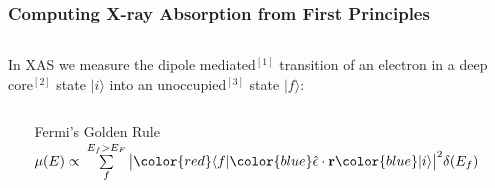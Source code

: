 \newcommand{\GMS}{\mathbb{G}}
\newcommand{\Gnot}{\mathsf{G^0}}
\newcommand{\tmat}{\mathsf{t}}
\newcommand{\boldr}{\boldsymbol{r}}

\begin{frame}[label=fgr]
  \frametitle{Computing X-ray Absorption from First Principles}
  \begin{columns}
    \begin{column}{0.75\linewidth}
      In XAS we measure the \alert{dipole mediated}$^\mathrm{[1]}$
      transition of an electron in a \alert{deep core}$^\mathrm{[2]}$
      state {\color{blue}$|i\rangle$} into an
      \alert{unoccupied}$^\mathrm{[3]}$ state
      {\color{red}$|f\rangle$}:

      \begin{columns}
        \begin{column}{0.15\linewidth}
          ~
        \end{column}
        \begin{column}{0.7\linewidth}
          \begin{block}{Fermi's Golden Rule}
            $\mu(E) \propto\> \sum\limits_f^{E_f>E_F}
            \big|{\color{red}\langle f|}
            {\color{blue}\hat{\epsilon}\cdot\mathbf{r}}
            {\color{blue}|i\rangle}\big|^2 \delta(E_f)$
          \end{block}
        \end{column}
        \begin{column}{0.15\linewidth}
          ~
        \end{column}
      \end{columns}

      \medskip


\end{column}
\end{columns}
\end{frame}
